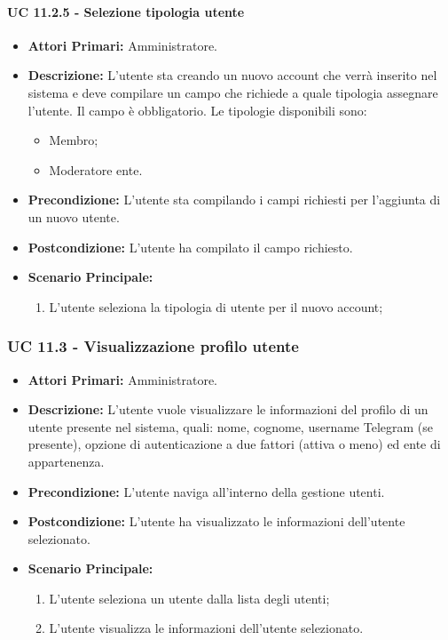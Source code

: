 			\paragraph{UC 11.2.5 - Selezione tipologia utente}
			\begin{itemize}
				\item \textbf{Attori Primari:} Amministratore.
				\item \textbf{Descrizione:} L'utente sta creando un nuovo account che verrà inserito nel sistema e deve compilare un campo che richiede a quale tipologia assegnare l'utente. Il campo è obbligatorio. Le tipologie disponibili sono:
				\begin{itemize}
					\item Membro;
					\item Moderatore ente.
				\end{itemize}
				\item \textbf{Precondizione:} L'utente sta compilando i campi richiesti per l'aggiunta di un nuovo utente.
				\item \textbf{Postcondizione:} L'utente ha compilato il campo richiesto.
				\item \textbf{Scenario Principale:}
				\begin{enumerate}
					\item{L'utente seleziona la tipologia di utente per il nuovo account;}
				\end{enumerate}	
			\end{itemize}

			\subsubsection{UC 11.3 - Visualizzazione profilo utente}
			\begin{itemize}
				\item \textbf{Attori Primari:} Amministratore.
				\item \textbf{Descrizione:} L'utente vuole visualizzare le informazioni del profilo di un utente presente nel sistema, quali: nome, cognome, username Telegram (se presente), opzione di autenticazione a due fattori (attiva o meno) ed ente di appartenenza.
				\item \textbf{Precondizione:} L'utente naviga all'interno della gestione utenti.
				\item \textbf{Postcondizione:} L'utente ha visualizzato le informazioni dell'utente selezionato.
				\item \textbf{Scenario Principale:}
				\begin{enumerate}
					\item{L'utente seleziona un utente dalla lista degli utenti;}
					\item{L'utente visualizza le informazioni dell'utente selezionato.}
				\end{enumerate}
			\end{itemize}


